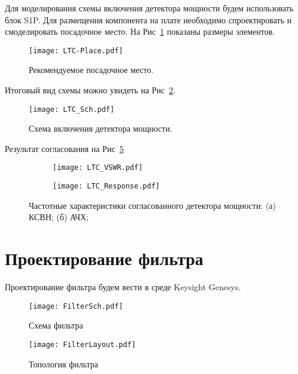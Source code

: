 Для моделирования схемы включения детектора мощности будем использовать блок S1P. Для размещения компонента на плате необходимо спроектировать и смоделировать посадочное место. На Рис~\ref{fig:LTC-Place} показаны размеры элементов. 

\begin{figure}[!ht]
	\centering
	\texttt{[image: LTC-Place.pdf]}
	\caption{Рекомендуемое посадочное место.}%
	\label{fig:LTC-Place}
\end{figure}

Итоговый вид схемы можно увидеть на Рис~\ref{fig:LTC_Sch}.

\begin{figure}[!ht]
	\centering
	\texttt{[image: LTC\_Sch.pdf]}
	\caption{Схема включения детектора мощности.}%
	\label{fig:LTC_Sch}
\end{figure}

Результат согласования на Рис~\ref{fig:LTC-data}

\begin{figure}[H]
	\captionsetup{singlelinecheck=off, justification=centering}
	\centering
	\begin{subfigure}[b]{0.5\textwidth}
		\centering
		\texttt{[image: LTC\_VSWR.pdf]}
		\caption{}%
		\label{fig:LTC_VSWR}
	\end{subfigure}
	\hfill
	\begin{subfigure}[b]{0.45\textwidth}
		\centering
		\texttt{[image: LTC\_Response.pdf]}
		\caption{}%
		\label{fig:LTC_Response}
	\end{subfigure}
	
	\caption{%
		Частотные характеристики согласованного детектора мощности:
		(а) КСВН;
		(б) АЧХ;
	}%
	\label{fig:LTC-data}
\end{figure}

\section{Проектирование фильтра}

Проектирование фильтра будем вести в среде Keysight Genesys.

\begin{figure}[H]
	\centering
	\texttt{[image: FilterSch.pdf]}
	\caption{Схема фильтра}%
	\label{fig:FilterSch}
\end{figure}

\begin{figure}[H]
	\centering
	\texttt{[image: FilterLayout.pdf]}
	\caption{Топология фильтра}%
	\label{fig:FilterLayout}
\end{figure}

